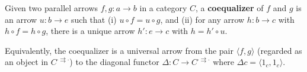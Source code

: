 Given two parallel arrows $f, g: a \to b$ in a category $C$, a \textbf{coequalizer} of $f$ and $g$ is an arrow $u: b \to e$ such that (i) $u \circ f = u \circ g$, and (ii) for any arrow $h: b \to c$ with $h \circ f = h \circ g$, there is a unique arrow $h': e \to c$ with $h = h' \circ u$.
    
Equivalently, the coequalizer is a universal arrow from the pair $\langle f, g \rangle$ (regarded as an object in $C^{\cdot \rightrightarrows \cdot}$) to the diagonal functor $\Delta: C \to C^{\cdot \rightrightarrows \cdot}$ where $\Delta c = \langle 1_c, 1_c \rangle$.